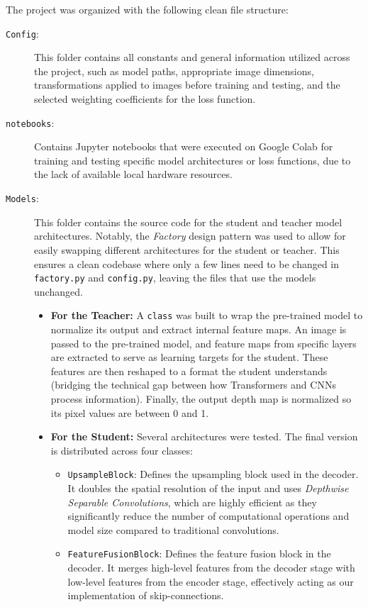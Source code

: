 The project was organized with the following clean file structure:
\begin{description}
    \item[\texttt{Config}:] This folder contains all constants and general information utilized across the project, such as model paths, appropriate image dimensions, transformations applied to images before training and testing, and the selected weighting coefficients for the loss function.
    \item[\texttt{notebooks}:] Contains Jupyter notebooks that were executed on Google Colab for training and testing specific model architectures or loss functions, due to the lack of available local hardware resources.
    \item[\texttt{Models}:] This folder contains the source code for the student and teacher model architectures. Notably, the \textit{Factory} design pattern was used to allow for easily swapping different architectures for the student or teacher. This ensures a clean codebase where only a few lines need to be changed in \texttt{factory.py} and \texttt{config.py}, leaving the files that use the models unchanged.
    \begin{itemize}
        \item \textbf{For the Teacher:} A \texttt{class} was built to wrap the pre-trained model to normalize its output and extract internal feature maps. An image is passed to the pre-trained model, and feature maps from specific layers are extracted to serve as learning targets for the student. These features are then reshaped to a format the student understands (bridging the technical gap between how Transformers and CNNs process information). Finally, the output depth map is normalized so its pixel values are between 0 and 1.
        \item \textbf{For the Student:} Several architectures were tested. The final version is distributed across four classes:
        \begin{itemize}
            \item \texttt{UpsampleBlock}: Defines the upsampling block used in the decoder. It doubles the spatial resolution of the input and uses \textit{Depthwise Separable Convolutions}, which are highly efficient as they significantly reduce the number of computational operations and model size compared to traditional convolutions.
            \item \texttt{FeatureFusionBlock}: Defines the feature fusion block in the decoder. It merges high-level features from the decoder stage with low-level features from the encoder stage, effectively acting as our implementation of skip-connections.

\end{itemize}
\end{itemize}
\end{description}
